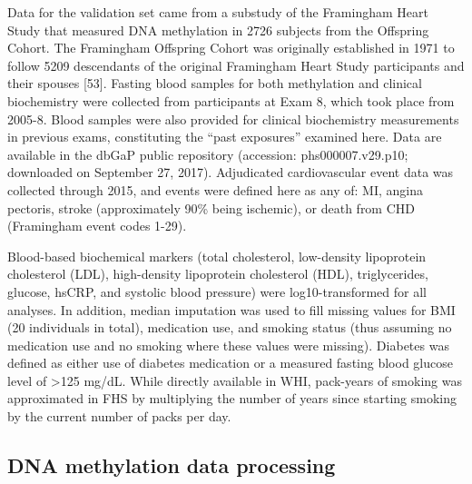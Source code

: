 \documentclass[]{bmcart}
\begin{document}
Data for the validation set came from a substudy of the Framingham Heart
Study that measured DNA methylation in 2726 subjects from the Offspring
Cohort. The Framingham Offspring Cohort was originally established in
1971 to follow 5209 descendants of the original Framingham Heart Study
participants and their spouses {[}53{]}. Fasting blood samples for both
methylation and clinical biochemistry were collected from participants
at Exam 8, which took place from 2005-8. Blood samples were also
provided for clinical biochemistry measurements in previous exams,
constituting the ``past exposures'' examined here. Data are available in
the dbGaP public repository (accession: phs000007.v29.p10; downloaded on
September 27, 2017). Adjudicated cardiovascular event data was collected
through 2015, and events were defined here as any of: MI, angina
pectoris, stroke (approximately 90\% being ischemic), or death from CHD
(Framingham event codes 1-29).

Blood-based biochemical markers (total cholesterol, low-density
lipoprotein cholesterol (LDL), high-density lipoprotein cholesterol
(HDL), triglycerides, glucose, hsCRP, and systolic blood pressure) were
log10-transformed for all analyses. In addition, median imputation was
used to fill missing values for BMI (20 individuals in total),
medication use, and smoking status (thus assuming no medication use and
no smoking where these values were missing). Diabetes was defined as
either use of diabetes medication or a measured fasting blood glucose
level of \textgreater{}125 mg/dL. While directly available in WHI,
pack-years of smoking was approximated in FHS by multiplying the number
of years since starting smoking by the current number of packs per day.

\subsection{DNA methylation data
processing}\label{dna-methylation-data-processing}
\end{document}
